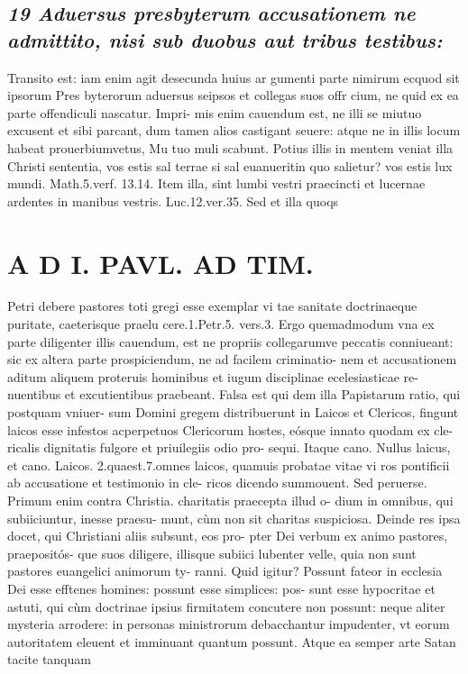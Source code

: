 \documentclass{article}
\begin{document}
\begin{pages}
\subsection*{\textit{19 Aduersus presbyterum accusationem ne admittito, nisi sub duobus aut tribus testibus: }}\pstart Transito est: iam enim agit desecunda huius ar gumenti parte nimirum ecquod sit ipsorum Pres byterorum aduersus seipsos et collegas suos offr cium, ne quid ex ea parte offendiculi nascatur. Impri- mis enim cauendum est, ne illi se miutuo excusent et sibi parcant, dum tamen alios castigant seuere: atque ne in illis locum habeat prouerbiumvetus, Mu tuo muli scabunt. Potius illis in mentem veniat illa Christi sententia, vos estis sal terrae si sal euanueritin quo salietur? vos estis lux mundi. Math.5.verf. 13.14. Item illa, sint lumbi vestri praecincti et lucernae ardentes in manibus vestris. Luc.12.ver.35. Sed et illa quoqs  \pend
\section*{A D I. PAVL. AD TIM. }
\marginpar{[ p.312 ]}\pstart Petri debere pastores toti gregi esse exemplar vi tae sanitate doctrinaeque puritate, caeterisque  praelu cere.1.Petr.5. vers.3. Ergo quemadmodum vna ex parte diligenter illis cauendum, est ne propriis collegarumve peccatis conniueant: sic ex altera parte prospiciendum, ne ad facilem criminatio- nem et accusationem aditum aliquem proteruis hominibus et iugum disciplinae ecelesiasticae re- nuentibus et excutientibus praebeant. Falsa est qui dem illa Papistarum ratio, qui postquam vniuer- sum Domini gregem distribuerunt in Laicos et Clericos, fingunt laicos esse infestos acperpetuos Clericorum hostes, eósque innato quodam ex cle- ricalis dignitatis fulgore et priuilegiis odio pro- sequi. Itaque cano. Nullus laicus, et cano. Laicos. 2.quaest.7.omnes laicos, quamuis probatae vitae vi ros pontificii ab accusatione et testimonio in cle- ricos dicendo summouent. Sed peruerse. Primum enim contra Christia. charitatis praecepta illud o- dium in omnibus, qui subiiciuntur, inesse praesu- munt, cùm non sit charitas suspiciosa. Deinde res ipsa docet, qui Christiani aliis subsunt, eos pro- pter Dei verbum ex animo pastores, praepositós- que suos diligere, illisque subiici lubenter velle, quia non sunt pastores euangelici animorum ty- ranni. Quid igitur? Possunt fateor in ecclesia Dei esse efftenes homines: possunt esse simplices: pos- sunt esse hypocritae et astuti, qui cùm doctrinae ipsius firmitatem concutere non possunt: neque aliter mysteria arrodere: in personas ministrorum debacchantur impudenter, vt eorum autoritatem eleuent et imminuant quantum possunt.  \pend\pstart Atque ea semper arte Satan tacite tanquam  \pend

\end{pages}
\end{document}
